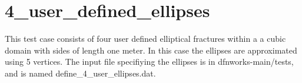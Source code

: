 \documentclass[letterpaper,10pt,english]{sphinxmanual}
\begin{document}
\section{4\_user\_defined\_ellipses}
\label{examples:user-defined-ellipses}
This test case consists of four user defined elliptical fractures within a a cubic domain with sides of length one meter. In this case the ellipses are approximated using 5 vertices. The input file specifiying the ellipses is in dfnworks-main/tests, and is named define\_4\_user\_ellipses.dat.

{\hfill{}\hfill}

\begin{DUlineblock}{0em}
\item[] 
\item[] 
\end{DUlineblock}

{\hfill{}\hfill}

\begin{DUlineblock}{0em}
\item[] 
\item[] 
\end{DUlineblock}

{\hfill{}\hfill}
\end{document}
